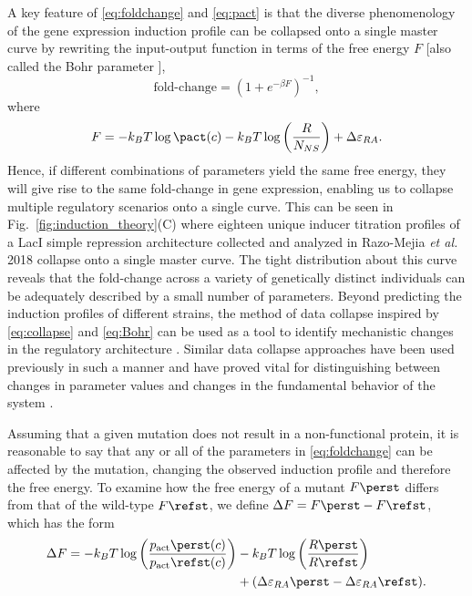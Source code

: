 A key feature of \eqref{eq:foldchange} and \eqref{eq:pact} is that the diverse
phenomenology of the gene expression induction profile can be collapsed onto
a single master curve by rewriting the input-output function in terms of the
free energy $F$ [also called the Bohr parameter \cite{Phillips2015}],
\begin{equation}
\text{fold-change} = \left(1 + e^{-\beta F}\right)^{-1},
\label{eq:collapse}
\end{equation}
where
\begin{equation}
F = -k_BT \log\pact(c) - k_BT\log\left({R \over N_{NS}}\right) + \Delta\varepsilon_{RA}.
\label{eq:Bohr}
\end{equation}
Hence, if different combinations of parameters yield the same free energy,
they will give rise to the same fold-change in gene expression, enabling us
to collapse multiple regulatory scenarios onto a single curve. This can be
seen in Fig.~\ref{fig:induction_theory}(C) where eighteen unique inducer
titration profiles of a LacI simple repression architecture collected and
analyzed in Razo-Mejia \textit{et al.} 2018 \cite{Razo-Mejia2018} collapse onto a
single master curve. The tight distribution about this curve reveals that the
fold-change across a variety of genetically distinct individuals can be
adequately described by a small number of parameters. Beyond predicting the
induction profiles of different strains, the method of data collapse inspired
by \eqref{eq:collapse} and \eqref{eq:Bohr} can be used as a tool to identify
mechanistic changes in the regulatory architecture \cite{Swem2008}. Similar data collapse approaches
have been used previously in such a manner and have proved vital for
distinguishing between changes in parameter values and changes in the
fundamental behavior of the system \cite{Swem2008, Keymer2006}.

Assuming that a given mutation does not result in a non-functional protein, it
is reasonable to say that any or all of the parameters in \eqref{eq:foldchange}
can be affected by the mutation, changing the observed induction profile and therefore the free 
energy. To examine how the free energy of a mutant $F\perst$
differs from that of the wild-type $F\refst$, we define $\Delta F = F\perst -
F\refst$, which has the form
\begin{equation}
    \begin{aligned}
\Delta F = -k_BT\log\left({p_\text{act}\perst(c) \over  p_\text{act}\refst(c)}\right) &- k_BT \log\left({R\perst \over R\refst}\right)\\
 &+ (\Delta\varepsilon_{RA}\perst - \Delta\varepsilon_{RA}\refst).
    \end{aligned}
    \label{eq:delF}
\end{equation}

